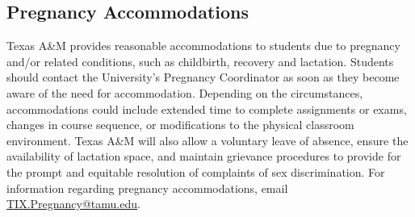 \documentclass[11pt]{article}
\begin{document}
\subsection*{Pregnancy Accommodations}
Texas A\&M provides reasonable accommodations to students due to pregnancy and/or related conditions, such as childbirth, recovery and lactation. Students should contact the University’s Pregnancy Coordinator as soon as they become aware of the need for accommodation. Depending on the circumstances, accommodations could include extended time to complete assignments or exams, changes in course sequence, or modifications to the physical classroom environment. Texas A\&M will also allow a voluntary leave of absence, ensure the availability of lactation space, and maintain grievance procedures to provide for the prompt and equitable resolution of complaints of sex discrimination. For information regarding pregnancy accommodations, email \url{TIX.Pregnancy@tamu.edu}.
\end{document}

